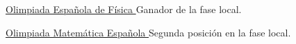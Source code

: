 \divider

\cvachievement{\faTrophy}
{\href{https://rsef.es/olimpiada-espanola-de-fisica}
  {Olimpiada Española de Física \smallskip}}
{\small {}%
  \small{}}
Ganador de la fase local.

\divider

\cvachievement{\faTrophy}
{\href{http://www.olimpiadamatematica.es/platea.pntic.mec.es/_csanchez/olimmain.html}
  {Olimpiada Matemática Española \smallskip}}
{\small{}%
  \small{}}
Segunda posición en la fase local.
